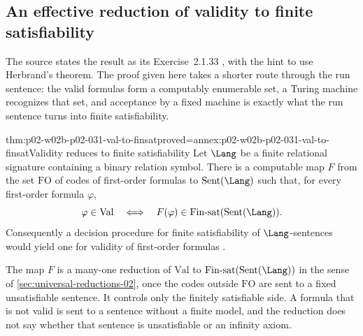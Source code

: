 \subsection{An effective reduction of validity to finite satisfiability}
\label{sec:p02-w02b-p02-031-val-to-finsat}

The source states the result as its Exercise~2.1.33
\cite[Sect.~2.1.2, p.~36]{BorgerGradelGurevich1997}, with the hint to use
Herbrand's theorem.  The proof given here takes a shorter route through the
run sentence: the valid formulas form a computably enumerable set, a Turing
machine recognizes that set, and acceptance by a fixed machine is exactly what
the run sentence turns into finite satisfiability.

\begin{hbtheorem}{thm:p02-w02b-p02-031-val-to-finsat}{proved=annex:p02-w02b-p02-031-val-to-finsat}{Validity reduces to finite satisfiability}
Let \(\Lang\) be a finite relational signature containing a binary relation
symbol.  There is a computable map \(F\) from the set \(\mathrm{FO}\) of codes
of first-order formulas to \(\operatorname{Sent}(\Lang)\) such that, for
every first-order formula \(\varphi\),
\[
 \varphi\in\mathrm{Val}
 \quad\Longleftrightarrow\quad
 F(\varphi)\in\mathrm{Fin\text{-}sat}(\operatorname{Sent}(\Lang)).
\]
Consequently a decision procedure for finite satisfiability of
\(\Lang\)-sentences would yield one for validity of first-order formulas
\cite[Sect.~2.1.2, Exercise~2.1.33]{BorgerGradelGurevich1997}.
\end{hbtheorem}

The map \(F\) is a many-one reduction of \(\mathrm{Val}\) to
\(\mathrm{Fin\text{-}sat}(\operatorname{Sent}(\Lang))\) in the sense of
\cref{sec:universal-reductions-02}, once the codes outside \(\mathrm{FO}\) are
sent to a fixed unsatisfiable sentence.  It controls only the finitely
satisfiable side.  A formula that is not valid is sent to a sentence without
a finite model, and the reduction does not say whether that sentence is
unsatisfiable or an infinity axiom.

